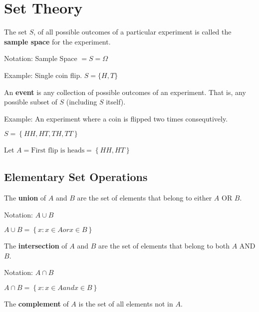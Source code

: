 \section*{Set Theory}

\begin{definition}
	The set $S$, of all possible outcomes of a particular experiment is called the \textbf{sample space} for the experiment.
	\label{Sample Space}
\end{definition}

Notation: Sample Space $= S = \Omega$

Example: Single coin flip. $S = \{H,T\}$

\begin{definition}[Event]
	An \textbf{event} is any collection of possible outcomes of an experiment. That is, any possible subset of $S$ (including $S$ itself).
\end{definition}

Example: An experiment where a coin is flipped two times consequtively.

$S = \left\{ HH,HT,TH,TT \right\}$

Let $A = \text{First flip is heads} = \left\{ HH, HT \right\}$

\subsection*{Elementary Set Operations}

\begin{definition}[Union]
	The \textbf{union} of $A$ and $B$ are the set of elements that belong to either $A$ OR $B$.
\end{definition}

Notation: $A \cup B$

$A \cup B = \left\{ x:x\in A or x \in B \right\}$

\begin{definition}[Intersection]
	The \textbf{intersection} of $A$ and $B$ are the set of elements that belong to both $A$ AND $B$.
\end{definition}

Notation: $A \cap B$

$A \cap B = \left\{ x: x \in A and x \in B \right\}$

\begin{definition}[Complement]
	The \textbf{complement} of $A$ is the set of all elements not in $A$.
\end{definition}

